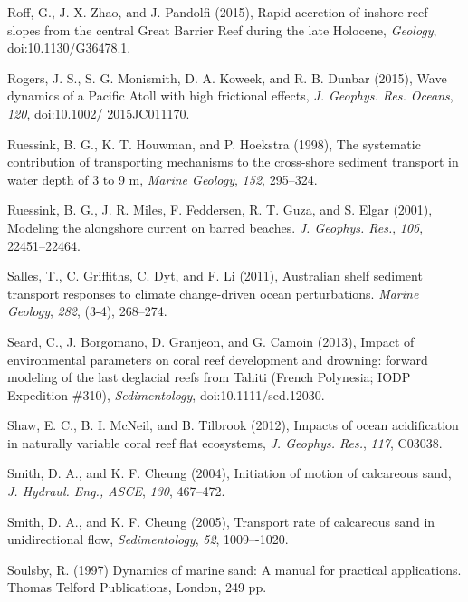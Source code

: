 \documentclass[default,jgrga]{agutex2015}
\begin{document}
\begin{article}
\begin{thebibliography}{}
Roff, G., J.-X. Zhao, and J. Pandolfi (2015), Rapid accretion of inshore reef slopes from the central Great Barrier Reef during the late Holocene, \textit{Geology}, doi:10.1130/G36478.1.

Rogers, J. S., S. G. Monismith, D. A. Koweek, and R. B. Dunbar (2015), Wave dynamics of a Pacific Atoll with high frictional effects, \textit{J. Geophys. Res. Oceans}, \textit{120}, doi:10.1002/ 2015JC011170.

Ruessink, B. G., K. T. Houwman, and P. Hoekstra (1998), The systematic contribution of transporting mechanisms to the cross-shore sediment transport in water depth of 3 to 9 m, \textit{Marine Geology}, \textit{152}, 295--324.

Ruessink, B. G., J. R. Miles, F. Feddersen, R. T. Guza, and S. Elgar (2001), Modeling the alongshore current on barred beaches.  \textit{J. Geophys. Res.}, \textit{106}, 22451--22464.

Salles, T., C. Griffiths, C. Dyt, and F. Li (2011), Australian shelf sediment transport responses to climate change-driven ocean perturbations. \textit{Marine Geology}, \textit{282}, (3-4), 268--274.

Seard, C., J. Borgomano, D. Granjeon, and G. Camoin (2013), Impact of environmental parameters on coral reef development and drowning: forward modeling of the last deglacial reefs from Tahiti (French Polynesia; IODP Expedition \#310), \textit{Sedimentology}, doi:10.1111/sed.12030.

Shaw, E. C., B. I. McNeil, and B. Tilbrook (2012), Impacts of ocean acidification in naturally variable coral reef flat ecosystems, \textit{J. Geophys. Res.}, \textit{117}, C03038.

Smith, D. A., and K. F. Cheung (2004), Initiation of motion of calcareous sand, \textit{J. Hydraul. Eng., ASCE}, \textit{130}, 467--472.

Smith, D. A., and K. F. Cheung (2005), Transport rate of calcareous sand in unidirectional flow, \textit{Sedimentology}, \textit{52}, 1009–-1020.

Soulsby, R. (1997) Dynamics of marine sand: A manual for practical applications. Thomas Telford Publications, London, 249 pp.


\end{thebibliography}
\end{article}
\end{document}
